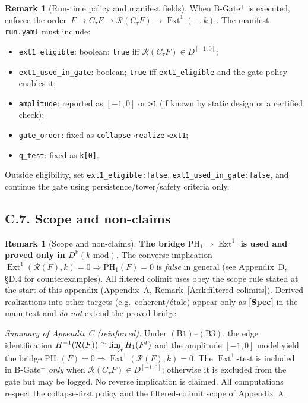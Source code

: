 \documentclass[11pt]{article}
\DeclareMathOperator{\Ext}{Ext}
\numberwithin{equation}{section}
\theoremstyle{definition}
\newtheorem{remark}[theorem]{Remark}
\begin{document}
\begin{remark}[Run-time policy and manifest fields]
When B-Gate\(^{+}\) is executed, enforce the order
\(\,F\to C_\tau F\to \mathcal{R}(C_\tau F)\to \Ext^1(-,k)\,\).
The manifest \texttt{run.yaml} must include:
\begin{itemize}
  \item \texttt{ext1\_eligible}: boolean; \texttt{true} iff \(\mathcal{R}(C_\tau F)\in D^{[-1,0]}\);
  \item \texttt{ext1\_used\_in\_gate}: boolean; \texttt{true} iff \texttt{ext1\_eligible} and the gate policy enables it;
  \item \texttt{amplitude}: reported as \([-1,0]\) or \texttt{>1} (if known by static design or a certified check);
  \item \texttt{gate\_order}: fixed as \texttt{collapse→realize→ext1};
  \item \texttt{q\_test}: fixed as \texttt{k[0]}.
\end{itemize}
Outside eligibility, set \texttt{ext1\_eligible:false}, \texttt{ext1\_used\_in\_gate:false}, and continue the gate using persistence/tower/safety criteria only.
\end{remark}

\subsection*{C.7. Scope and non-claims}

\begin{remark}[Scope and non-claims]
\textbf{The bridge \(\mathrm{PH}_1\Rightarrow \Ext^1\) is used and proved only in \(D^{\mathrm{b}}(k\text{-mod})\).}
The converse implication \(\Ext^1(\mathcal{R}(F),k)=0 \Rightarrow \mathrm{PH}_1(F)=0\) is \emph{false} in general (see Appendix~D, §D.4 for counterexamples).
All filtered colimit uses obey the scope rule stated at the start of this appendix (Appendix~A, Remark~\ref{A:rk:filtered-colimits}).
Derived realizations into other targets (e.g.\ coherent/étale) appear only as \textbf{[Spec]} in the main text and \emph{do not} extend the proved bridge.
\end{remark}

\medskip
\noindent\emph{Summary of Appendix C (reinforced).}
Under \((\mathrm{B}1)\)–\((\mathrm{B}3)\), the edge identification \(H^{-1}(\mathcal{R}(F))\cong \varinjlim_t H_1(F^t)\) and the amplitude \([-1,0]\) model yield the bridge \(\mathrm{PH}_1(F)=0\Rightarrow \Ext^1(\mathcal{R}(F),k)=0\).
The \(\Ext^1\)-test is included in B-Gate\(^{+}\) \emph{only} when \(\mathcal{R}(C_\tau F)\in D^{[-1,0]}\); otherwise it is excluded from the gate but may be logged.
No reverse implication is claimed.
All computations respect the collapse-first policy and the filtered-colimit scope of Appendix~A.
\end{document}
